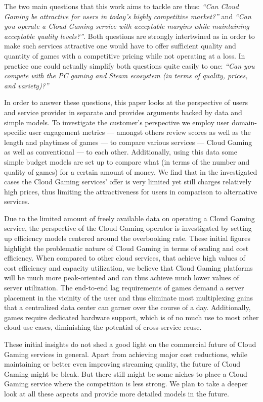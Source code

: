 The two main questions that this work aims to tackle are thus: 
\textit{``Can Cloud Gaming be attractive for users in today's highly 
competitive market?''} and \textit{``Can you operate a Cloud Gaming 
service with acceptable margins while maintaining acceptable quality 
levels?''}. Both questions are strongly intertwined as in order to make 
such services attractive one would have to offer sufficient quality and 
quantity of games with a competitive pricing while not operating at a 
loss. In practice one could actually simplify both questions quite 
easily to one: \textit{``Can you compete with the PC gaming and Steam 
ecosystem (in terms of quality, prices, and variety)?''}

In order to answer these questions, this paper looks at the perspective 
of users and service provider in separate and provides arguments backed 
by data and simple models. To investigate the customer's perspective we 
employ user domain-specific user engagement metrics --- amongst others 
review scores as well as the length and playtimes of games --- to 
compare various services --- Cloud Gaming as well as conventional --- 
to each other. Additionally, using this data some simple budget models 
are set up to compare what (in terms of the number and quality of 
games) for a certain amount of money. We find that in the investigated 
cases the Cloud Gaming services' offer is very limited yet still 
charges relatively high prices, thus limiting the attractiveness for 
users in comparison to alternative services.

Due to the limited amount of freely available data on operating a Cloud 
Gaming service, the perspective of the Cloud Gaming operator is 
investigated by setting up efficiency models centered around the 
overbooking rate. These initial figures highlight the problematic 
nature of Cloud Gaming in terms of scaling and cost efficiency. When 
compared to other cloud services, that achieve high values of cost 
efficiency and capacity utilization, we believe that Cloud Gaming 
platforms will be much more peak-oriented and can thus achieve much 
lower values of server utilization. The end-to-end lag requirements of 
games demand a server placement in the vicinity of the user and thus 
eliminate most multiplexing gains that a centralized data center can 
garner over the course of a day. Additionally, games require dedicated 
hardware support, which is of no much use to most other cloud use 
cases, diminishing the potential of cross-service reuse.

These initial insights do not shed a good light on the commercial 
future of Cloud Gaming services in general. Apart from achieving major 
cost reductions, while maintaining or better even improving streaming 
quality, the future of Cloud Gaming might be bleak. But there still 
might be some niches to place a Cloud Gaming service where the 
competition is less strong. We plan to take a deeper look at all these 
aspects and provide more detailed models in the future.

